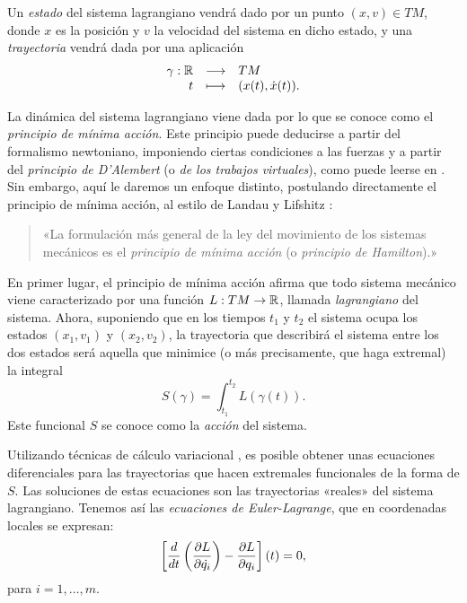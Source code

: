 Un \emph{estado} del sistema lagrangiano vendrá dado por un punto $(x,v) \in TM$, donde $x$ es la posición y $v$ la velocidad del sistema en dicho estado, y una \emph{trayectoria} vendrá dada por una aplicación
\begin{equation*}
  \begin{array}{rcl}
    \gamma: \mathbb{R} & \longrightarrow & TM \\
    t & \longmapsto & (x(t), \dot{x}(t)).
  \end{array}
\end{equation*}

La dinámica del sistema lagrangiano viene dada por lo que se conoce como el \emph{principio de mínima acción}. Este principio puede deducirse a partir del formalismo newtoniano, imponiendo ciertas condiciones a las fuerzas y a partir del \emph{principio de D'Alembert} (o \emph{de los trabajos virtuales}), como puede leerse en \cite{goldstein}. Sin embargo, aquí le daremos un enfoque distinto, postulando directamente el principio de mínima acción, al estilo de Landau y Lifshitz \cite{landau}:
  \begin{quote}
    «La formulación más general de la ley del movimiento de los sistemas mecánicos es el \emph{principio de mínima acción} (o \emph{principio de Hamilton}).»
  \end{quote}

  En primer lugar, el principio de mínima acción afirma que todo sistema mecánico viene caracterizado por una función $L: TM \rightarrow \mathbb{R}$, llamada \emph{lagrangiano} del sistema. Ahora, suponiendo que en los tiempos $t_1$ y $t_2$ el sistema ocupa los estados $(x_1,v_1)$ y $(x_2,v_2)$, la trayectoria que describirá el sistema entre los dos estados será aquella que minimice (o más precisamente, que haga extremal) la integral
  \begin{equation*}
    S(\gamma) = \int_{t_1}^{t_2} L(\gamma(t)).
  \end{equation*}
  Este funcional $S$ se conoce como la \emph{acción} del sistema.

  Utilizando técnicas de cálculo variacional \cite{arnold}, es posible obtener unas ecuaciones diferenciales para las trayectorias que hacen extremales funcionales de la forma de $S$. Las soluciones de estas ecuaciones son las trayectorias «reales» del sistema lagrangiano. Tenemos así las \emph{ecuaciones de Euler-Lagrange}, que en coordenadas locales se expresan:
  \begin{equation*}
    \left[\frac{d}{dt}\left( \frac{\partial L}{\partial \dot{q_i}} \right)- \frac{\partial L}{\partial q_i}\right](t) = 0,    
  \end{equation*}
  para $i=1,\dots,m$.

